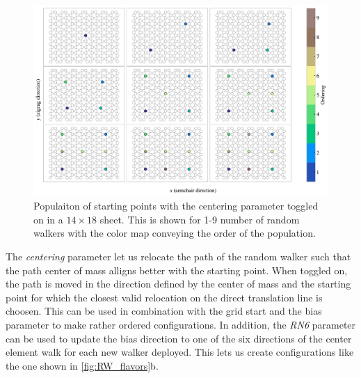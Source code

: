 \begin{figure}[H]
  \centering
  \includegraphics[width=\linewidth]{figures/system/grid_start.pdf}
  \caption{Populaiton of starting points with the centering parameter toggled on in a $14\times 18$ sheet. This is shown for 1-9 number of random walkers with the color map conveying the order of the population.}
  \label{fig:grid_start}
\end{figure}

The \textit{centering} parameter let us relocate the path of the random walker such that the path center of mass alligns better with the starting point. When toggled on, the path is moved in the direction defined by the center of mass and the starting point for which the closest valid relocation on the direct translation line is choosen. This can be used in combination with the grid start and the bias parameter to make rather ordered configurations. In addition, the \textit{RN6} parameter can be used to update the bias direction to one of the six directions of the center element walk for each new walker deployed. This lets us create configurations like the one shown in \cref{fig:RW_flavors}\textcolor{red!50!black}{b}. 


